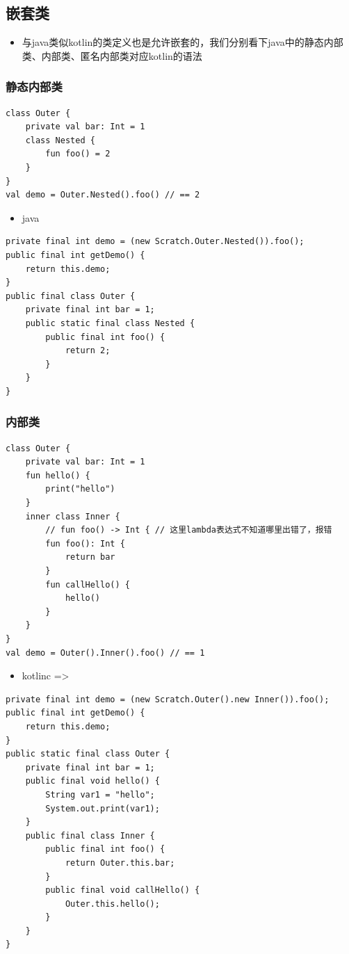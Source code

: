 \documentclass[9pt, b5paper]{article}
\begin{document}
\subsection{嵌套类}
\label{sec-7-9}
\begin{itemize}
\item 与java类似kotlin的类定义也是允许嵌套的，我们分别看下java中的静态内部类、内部类、匿名内部类对应kotlin的语法
\end{itemize}
\subsubsection{静态内部类}
\label{sec-7-9-1}
\begin{verbatim}
class Outer {
    private val bar: Int = 1
    class Nested {
        fun foo() = 2
    }
}
val demo = Outer.Nested().foo() // == 2
\end{verbatim}
\begin{itemize}
\item java
\end{itemize}
\begin{verbatim}
private final int demo = (new Scratch.Outer.Nested()).foo();
public final int getDemo() {
    return this.demo;
}
public final class Outer {
    private final int bar = 1;
    public static final class Nested {
        public final int foo() {
            return 2;
        }
    }
}
\end{verbatim}
\subsubsection{内部类}
\label{sec-7-9-2}
\begin{verbatim}
class Outer {
    private val bar: Int = 1
    fun hello() {
        print("hello")
    }
    inner class Inner {
        // fun foo() -> Int { // 这里lambda表达式不知道哪里出错了，报错
        fun foo(): Int {
            return bar
        }
        fun callHello() {
            hello()
        }
    }
}
val demo = Outer().Inner().foo() // == 1
\end{verbatim}
\begin{itemize}
\item kotlinc =>
\end{itemize}
\begin{verbatim}
private final int demo = (new Scratch.Outer().new Inner()).foo();
public final int getDemo() {
    return this.demo;
}
public static final class Outer {
    private final int bar = 1;
    public final void hello() {
        String var1 = "hello";
        System.out.print(var1);
    }
    public final class Inner {
        public final int foo() {
            return Outer.this.bar;
        }
        public final void callHello() {
            Outer.this.hello();
        }
    }
}
\end{verbatim}
\end{document}
